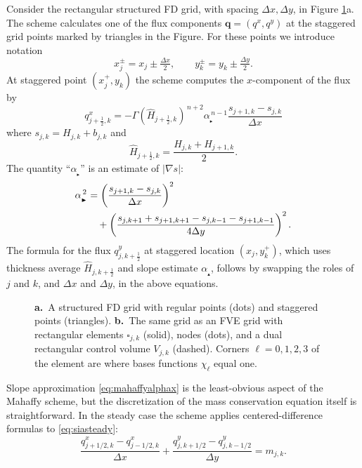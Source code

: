 \documentclass[twocolumn,letterpaper]{igs}
\newcommand\bq{\mathbf{q}}
\newcommand{\grad}{\nabla}
\newcommand\alpharight{\alpha_{{}_{\blacktriangleright}}}
\newcommand\alphaup{\alpha_{{\!}_{\blacktriangle}}}
\newcommand{\dxtwo}{\tfrac{\Delta x}{2}}
\newcommand{\dytwo}{\tfrac{\Delta y}{2}}
\newcommand{\half}{\tfrac{1}{2}}
\begin{document}
Consider the rectangular structured FD grid, with spacing $\Delta x,\Delta y$, in Figure \ref{fig:fdfemgrids}a.  The \cite{Mahaffy1976} scheme calculates one of the flux components $\bq=(q^x,q^y)$ at the staggered grid points marked by triangles in the Figure.  For these points we introduce notation
\begin{equation}
x_j^\pm = x_j \pm \dxtwo, \qquad y_k^\pm = y_k \pm \dytwo. \label{eq:definexypm}
\end{equation}
At staggered point $(x_j^+,y_k)$ the scheme computes the $x$-component of the flux by
\begin{equation}
q^x_{j+\half,k} = - \Gamma (\hat H_{j+\half,k})^{\,n+2} \alpharight^{\,n-1} \frac{s_{j+1,k} - s_{j,k}}{\Delta x}  \label{eq:mahaffyqx}
\end{equation}
where $s_{j,k} = H_{j,k} + b_{j,k}$ and
\begin{equation}
  \hat H_{j+\half,k} = \frac{H_{j,k} + H_{j+1,k}}{2}.  \label{eq:mahaffyHav}
\end{equation}
The quantity ``$\alpharight$\!'' is an estimate of $|\grad s|$:
\begin{align}
\alpharight^{\,2} &= \left(\frac{s_{j+1,k} - s_{j,k}}{\Delta x}\right)^2  \label{eq:mahaffyalphax} \\
  &\quad + \left(\frac{s_{j,k+1} + s_{j+1,k+1} - s_{j,k-1} - s_{j+1,k-1}}{4 \Delta y}\right)^2. \notag
\end{align}
The formula for the flux $q^y_{j,k+\half}$ at staggered location $(x_j,y_k^+)$, which uses thickness average $\hat H_{j,k+\half}$ and slope estimate $\alphaup$, follows by swapping the roles of $j$ and $k$, and $\Delta x$ and $\Delta y$, in the above equations.

\begin{figure}[ht]
\begin{center}
 \quad 
\end{center}
\caption{\textbf{a.}~A structured FD grid with regular points (dots) and staggered points (triangles).  \textbf{b.}~The same grid as an FVE grid with rectangular elements $\square_{j,k}$ (solid), nodes (dots), and a dual rectangular control volume $V_{j,k}$ (dashed).  Corners $\ell=0,1,2,3$ of the element are where bases functions $\chi_\ell$ equal one.}
\label{fig:fdfemgrids}
\end{figure}

Slope approximation \eqref{eq:mahaffyalphax} is the least-obvious aspect of the Mahaffy scheme, but the discretization of the mass conservation equation itself is straightforward.  In the steady case the scheme applies centered-difference formulas \citep{MortonMayers2005} to \eqref{eq:siasteady}:
\begin{equation}
\frac{q^x_{j+1/2,k} - q^x_{j-1/2,k}}{\Delta x} + \frac{q^y_{j,k+1/2}- q^y_{j,k-1/2}}{\Delta y} = m_{j,k}.  \label{eq:siasteadyfd}
\end{equation}
\end{document}
